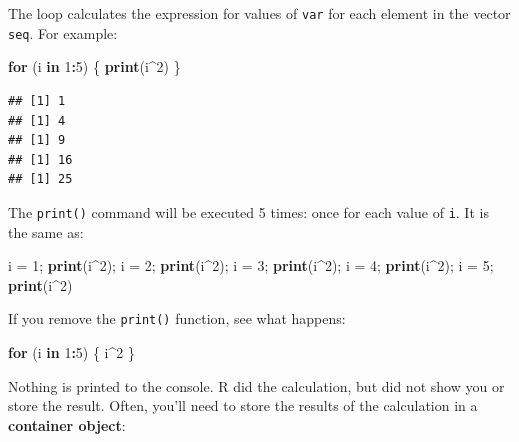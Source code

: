 \documentclass[]{book}
\newenvironment{Shaded}{\begin{snugshade}}{\end{snugshade}}
\newcommand{\ControlFlowTok}[1]{\textcolor[rgb]{0.13,0.29,0.53}{\textbf{#1}}}
\newcommand{\DecValTok}[1]{\textcolor[rgb]{0.00,0.00,0.81}{#1}}
\newcommand{\KeywordTok}[1]{\textcolor[rgb]{0.13,0.29,0.53}{\textbf{#1}}}
\newcommand{\NormalTok}[1]{#1}
\newcommand{\OperatorTok}[1]{\textcolor[rgb]{0.81,0.36,0.00}{\textbf{#1}}}
\newcommand{\StringTok}[1]{\textcolor[rgb]{0.31,0.60,0.02}{#1}}
\begin{document}
The loop calculates the expression for values of \texttt{var} for each element in the vector \texttt{seq}. For example:

\begin{Shaded}
\begin{Highlighting}[]
\ControlFlowTok{for}\NormalTok{ (i }\ControlFlowTok{in} \DecValTok{1}\OperatorTok{:}\DecValTok{5}\NormalTok{) \{}
  \KeywordTok{print}\NormalTok{(i}\OperatorTok{^}\DecValTok{2}\NormalTok{)}
\NormalTok{\}}
\end{Highlighting}
\end{Shaded}

\begin{verbatim}
## [1] 1
## [1] 4
## [1] 9
## [1] 16
## [1] 25
\end{verbatim}

The \texttt{print()} command will be executed 5 times: once for each value of \texttt{i}. It is the same as:

\begin{Shaded}
\begin{Highlighting}[]
\NormalTok{i =}\StringTok{ }\DecValTok{1}\NormalTok{; }\KeywordTok{print}\NormalTok{(i}\OperatorTok{^}\DecValTok{2}\NormalTok{); i =}\StringTok{ }\DecValTok{2}\NormalTok{; }\KeywordTok{print}\NormalTok{(i}\OperatorTok{^}\DecValTok{2}\NormalTok{); i =}\StringTok{ }\DecValTok{3}\NormalTok{; }\KeywordTok{print}\NormalTok{(i}\OperatorTok{^}\DecValTok{2}\NormalTok{); i =}\StringTok{ }\DecValTok{4}\NormalTok{; }\KeywordTok{print}\NormalTok{(i}\OperatorTok{^}\DecValTok{2}\NormalTok{); i =}\StringTok{ }\DecValTok{5}\NormalTok{; }\KeywordTok{print}\NormalTok{(i}\OperatorTok{^}\DecValTok{2}\NormalTok{)}
\end{Highlighting}
\end{Shaded}

If you remove the \texttt{print()} function, see what happens:

\begin{Shaded}
\begin{Highlighting}[]
\ControlFlowTok{for}\NormalTok{ (i }\ControlFlowTok{in} \DecValTok{1}\OperatorTok{:}\DecValTok{5}\NormalTok{) \{}
\NormalTok{  i}\OperatorTok{^}\DecValTok{2}
\NormalTok{\}}
\end{Highlighting}
\end{Shaded}

Nothing is printed to the console. R did the calculation, but did not show you or store the result. Often, you'll need to store the results of the calculation in a \textbf{container object}:
\end{document}
